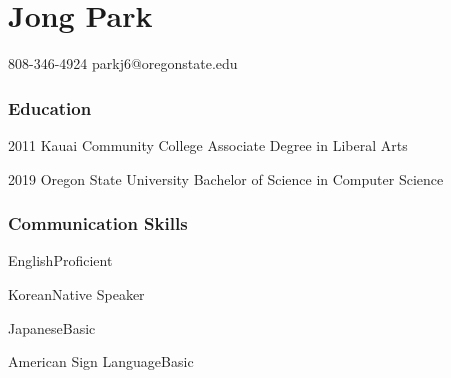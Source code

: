 \documentclass{tccv}
\begin{document}
	
\part{Jong Park}
	{808-346-4924}
	{parkj6@oregonstate.edu}
	
\section{Education}
	\begin{yearlist}
		\item{2011}
			{Kauai Community College}
			{Associate Degree in Liberal Arts}
		\item {2019}
			{Oregon State University}
			{Bachelor of Science in Computer Science}
	\end{yearlist}

\section {Communication Skills}
	\begin{factlist}
		\item {English}{Proficient}
		\item {Korean}{Native Speaker}
		\item {Japanese}{Basic}
		\item {American Sign Language}{Basic}
	\end{factlist}

\end{document}
